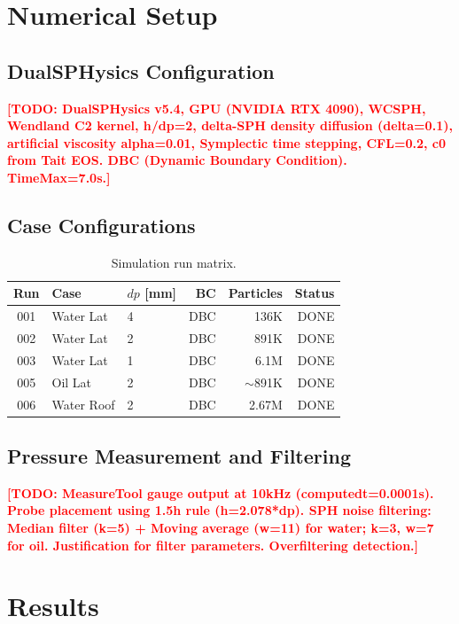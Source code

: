 \documentclass[twocolumn]{svjour3}
\newcommand{\TODO}[1]{\textcolor{red}{\textbf{[TODO: #1]}}}
\begin{document}
\section{Numerical Setup}
\label{sec:setup}

\subsection{DualSPHysics Configuration}
\label{sec:dsph-config}

\TODO{DualSPHysics v5.4, GPU (NVIDIA RTX 4090), WCSPH, Wendland C2 kernel,
h/dp=2, delta-SPH density diffusion (delta=0.1), artificial viscosity
alpha=0.01, Symplectic time stepping, CFL=0.2, c0 from Tait EOS.
DBC (Dynamic Boundary Condition). TimeMax=7.0s.}

\subsection{Case Configurations}
\label{sec:cases}

\begin{table}[t]
\caption{Simulation run matrix.}
\label{tab:run-matrix}
\centering
\small
\begin{tabular}{@{}cllrrr@{}}
\toprule
Run & Case & $dp$ [mm] & BC & Particles & Status \\
\midrule
001 & Water Lat & 4 & DBC & 136K & DONE \\
002 & Water Lat & 2 & DBC & 891K & DONE \\
003 & Water Lat & 1 & DBC & 6.1M & DONE \\
005 & Oil Lat & 2 & DBC & $\sim$891K & DONE \\
006 & Water Roof & 2 & DBC & 2.67M & DONE \\
\bottomrule
\end{tabular}
\end{table}

\subsection{Pressure Measurement and Filtering}
\label{sec:filtering}

\TODO{MeasureTool gauge output at 10kHz (computedt=0.0001s). Probe placement
using 1.5h rule (h=2.078*dp). SPH noise filtering: Median filter (k=5) +
Moving average (w=11) for water; k=3, w=7 for oil. Justification for filter
parameters. Overfiltering detection.}


\section{Results}
\label{sec:results}
\end{document}
